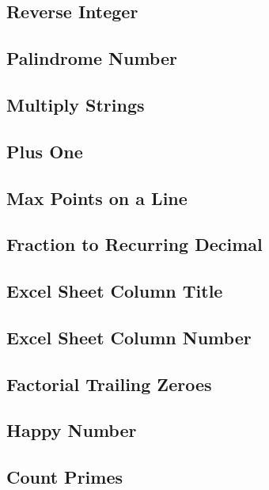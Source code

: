     
\subsection{Reverse Integer}

\subsection{Palindrome Number}

\subsection{Multiply Strings}

\subsection{Plus One}

\subsection{Max Points on a Line}

\subsection{Fraction to Recurring Decimal}

\subsection{Excel Sheet Column Title}

\subsection{Excel Sheet Column Number}

\subsection{Factorial Trailing Zeroes}

\subsection{Happy Number}

\subsection{Count Primes}

